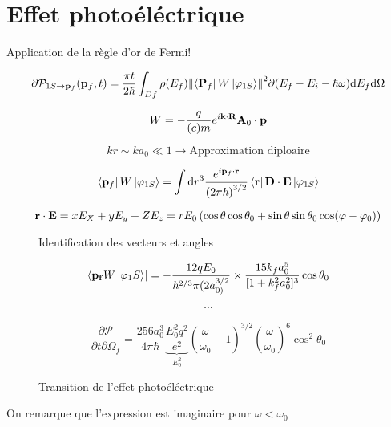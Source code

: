 



\section*{Effet photoéléctrique}

Application de la règle d'or de Fermi!

$$\partial \mathcal{P}_{1S\to \vb{p}_f} (\vb{p}_f, t) = \frac{\pi{}t}{2\hbar} \int_{Df} \rho(E_f ) \norm{\bra{\vb{P}_f}W\ket{\varphi_{1S}}}^2 \partial (E_f - E_i - \hbar \omega) \dd E_f \dd \Omega $$ 

$$W = -\frac{q}{(c)m} e^{i \vb{k} \cdot  \vb{R}} \vb{A}_0 \cdot \vb{p}$$ 

$$kr \sim ka_0 \ll 1 \to \text{Approximation diploaire} $$ 

$$\bra{\vb{p}_f}{W}\ket{\varphi_{1S} } = \int \dd r^3 \frac{e^{i \vb{p}_f \cdot \vb{r}}}{\left( 2\pi\hbar \right)^{3/2} } \bra{\vb{r}} \vb{D} \cdot  \vb{E} \ket{\varphi_{1S} }$$ 

$$\vb{r} \cdot  \vb{E} = xE_X+ yE_{y} + ZE_z = rE_0 \left( \cos\theta\cos\theta_0 + \sin\theta\sin\theta_0\cos(\varphi-\varphi_0) \right) $$ 

\begin{figure}[ht]
    \centering
    \caption{Identification des vecteurs et angles}
    \label{fig:identification-des-vecteurs-et-angles}
\end{figure}


$$\bra{\vb{p_{{f}}}W\ket{\varphi_1S} } = -\frac{12qE_0}{\hbar^{2/3}\pi(2a_{0)}^{3/2}} \times \frac{15k_{f}a_{0}^5}{[1+k_f^2a_0^2]^3}\cos\theta_0 $$ 

$$\dotsb$$ 

\begin{equation*}
	\boxed{\frac{\partial\mathcal{P}}{\partial t \partial \Omega_f}  = \frac{256a_0^3}{4\pi\hbar} \underbrace{\frac{E_0^2q^2}{e^2} }_{E_0^2} \left( \frac{\omega}{\omega_0} -1 \right)^{3/2} \left( \frac{\omega}{\omega_0}  \right)^6 \cos^2\theta_0   }
\end{equation*}

\begin{figure}[ht]
    \centering
    \caption{Transition de l'effet photoéléctrique}
    \label{fig:transition-de-l'effet-photoéléctrique}
\end{figure}

On remarque que l'expression est imaginaire pour $\omega < \omega_0$ 


